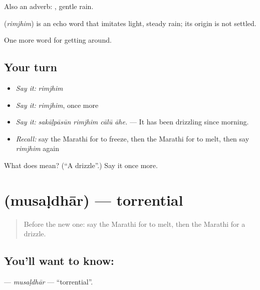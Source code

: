 Also an adverb:  , gentle rain.

\begin{cousinweb}
\textbf{} (\emph{rimjhim}) is an echo word that imitates light, steady rain; its origin is not settled.
\end{cousinweb}

\begin{grammarlens}[title={What you've built}]
One more word for getting around.
\end{grammarlens}

\subsection*{Your turn}
\begin{itemize}
\raggedright
  \item \emph{Say it:} \emph{rimjhim}
  \item \emph{Say it:} \emph{rimjhim}, once more
  \item \emph{Say it:} \emph{sakāḷpāsūn rimjhim cālū āhe.} — It has been drizzling since morning.
  \item \emph{Recall:} say the Marathi for to freeze, then the Marathi for to melt, then say \emph{rimjhim} again
\end{itemize}

\begin{tcolorbox}[breakable,colback=teal!4,colframe=teal!35!black,title={Before you move on}]
What does  mean? (\textquotedblleft{}A drizzle\textquotedblright{}.) Say it once more.
\end{tcolorbox}
\section[\texorpdfstring{\mr{मुसळधार} (musaḷdhār)}{मुसळधार (musaḷdhār)}]{ (musaḷdhār) — torrential}

\label{lesson:MR-C438-musaldhar}



\begin{quote}
Before the new one: say the Marathi for to melt, then the Marathi for a drizzle.
\end{quote}

\subsection*{You'll want to know: }
\textbf{} — \emph{musaḷdhār} — \textquotedblleft{}torrential\textquotedblright{}.

